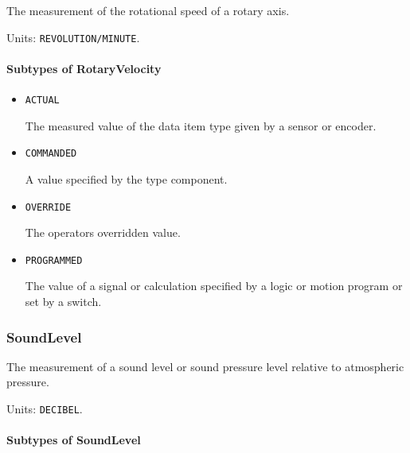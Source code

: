 The measurement of the rotational speed of a rotary axis.


Units: \texttt{REVOLUTION/MINUTE}.

\paragraph{Subtypes of RotaryVelocity}\mbox{}
\label{sec:Subtypes of RotaryVelocity}

\begin{itemize}

\item \texttt{ACTUAL}


The measured value of the data item type given by a sensor or encoder.

\item \texttt{COMMANDED}


A value specified by the  type component.

\item \texttt{OVERRIDE}


The operators overridden value.

\item \texttt{PROGRAMMED}


The value of a signal or calculation specified by a logic or motion program or set by a switch.


\end{itemize}

\subsubsection{SoundLevel}
\label{sec:SoundLevel}



The measurement of a sound level or sound pressure level relative to atmospheric pressure.


Units: \texttt{DECIBEL}.

\paragraph{Subtypes of SoundLevel}\mbox{}
\label{sec:Subtypes of SoundLevel}

